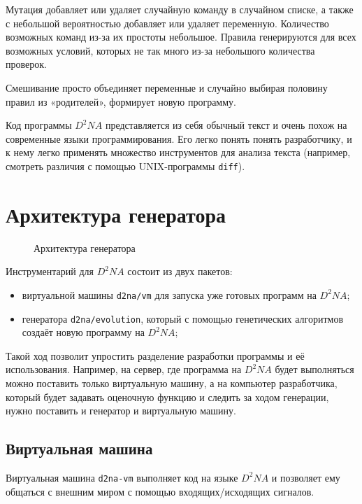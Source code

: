 \documentclass[utf8,a5paper,portrait,10pt]{eskdtext}
\begin{document}
Мутация добавляет или удаляет случайную команду в случайном списке, а также с
небольшой вероятностью добавляет или удаляет переменную. Количество возможных
команд из-за их простоты небольшое. Правила генерируются для всех возможных
условий, которых не так много из-за небольшого количества проверок.

Смешивание просто объединяет переменные и случайно выбирая половину правил из
«родителей», формирует новую программу.

Код программы $D^2NA$ представляется из себя обычный текст и очень похож на
современные языки программирования. Его легко понять понять разработчику,
и к нему легко применять множество инструментов для анализа текста (например,
смотреть различия с помощью UNIX-программы \texttt{diff}).

\newpage
\section{Архитектура генератора}

\begin{figure}
  \centering
  
  \caption{Архитектура генератора}
\end{figure}

Инструментарий для $D^2NA$ состоит из двух пакетов:
\begin{itemize}
  \item виртуальной машины \texttt{d2na/vm} для запуска уже готовых программ на
        $D^2NA$;
  \item генератора \texttt{d2na/evolution}, который с помощью генетических
        алгоритмов создаёт новую программу на $D^2NA$;
\end{itemize}

Такой ход позволит упростить разделение разработки программы и её использования.
Например, на сервер, где программа на $D^2NA$ будет выполняться можно поставить
только виртуальную машину, а на компьютер разработчика, который будет задавать
оценочную функцию и следить за ходом генерации, нужно поставить и генератор и
виртуальную машину.

\subsection{Виртуальная машина}

Виртуальная машина \texttt{d2na-vm} выполняет код на языке $D^2NA$ и позволяет
ему общаться с внешним миром с помощью входящих/исходящих сигналов.
\end{document}
